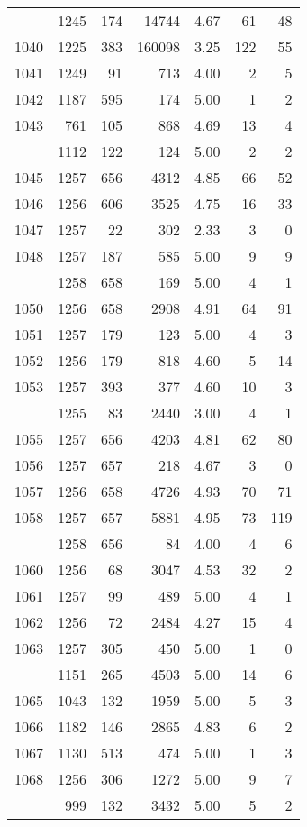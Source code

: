 \documentclass[
]{article}
\begin{document}
\begin{table}
\begin{tabular}[t]{lrrrrrr}
\addlinespace
1039 & 1245 & 174 & 14744 & 4.67 & 61 & 48\\
1040 & 1225 & 383 & 160098 & 3.25 & 122 & 55\\
1041 & 1249 & 91 & 713 & 4.00 & 2 & 5\\
1042 & 1187 & 595 & 174 & 5.00 & 1 & 2\\
1043 & 761 & 105 & 868 & 4.69 & 13 & 4\\
\addlinespace
1044 & 1112 & 122 & 124 & 5.00 & 2 & 2\\
1045 & 1257 & 656 & 4312 & 4.85 & 66 & 52\\
1046 & 1256 & 606 & 3525 & 4.75 & 16 & 33\\
1047 & 1257 & 22 & 302 & 2.33 & 3 & 0\\
1048 & 1257 & 187 & 585 & 5.00 & 9 & 9\\
\addlinespace
1049 & 1258 & 658 & 169 & 5.00 & 4 & 1\\
1050 & 1256 & 658 & 2908 & 4.91 & 64 & 91\\
1051 & 1257 & 179 & 123 & 5.00 & 4 & 3\\
1052 & 1256 & 179 & 818 & 4.60 & 5 & 14\\
1053 & 1257 & 393 & 377 & 4.60 & 10 & 3\\
\addlinespace
1054 & 1255 & 83 & 2440 & 3.00 & 4 & 1\\
1055 & 1257 & 656 & 4203 & 4.81 & 62 & 80\\
1056 & 1257 & 657 & 218 & 4.67 & 3 & 0\\
1057 & 1256 & 658 & 4726 & 4.93 & 70 & 71\\
1058 & 1257 & 657 & 5881 & 4.95 & 73 & 119\\
\addlinespace
1059 & 1258 & 656 & 84 & 4.00 & 4 & 6\\
1060 & 1256 & 68 & 3047 & 4.53 & 32 & 2\\
1061 & 1257 & 99 & 489 & 5.00 & 4 & 1\\
1062 & 1256 & 72 & 2484 & 4.27 & 15 & 4\\
1063 & 1257 & 305 & 450 & 5.00 & 1 & 0\\
\addlinespace
1064 & 1151 & 265 & 4503 & 5.00 & 14 & 6\\
1065 & 1043 & 132 & 1959 & 5.00 & 5 & 3\\
1066 & 1182 & 146 & 2865 & 4.83 & 6 & 2\\
1067 & 1130 & 513 & 474 & 5.00 & 1 & 3\\
1068 & 1256 & 306 & 1272 & 5.00 & 9 & 7\\
\addlinespace
1069 & 999 & 132 & 3432 & 5.00 & 5 & 2\\

\end{tabular}
\end{table}
\end{document}
